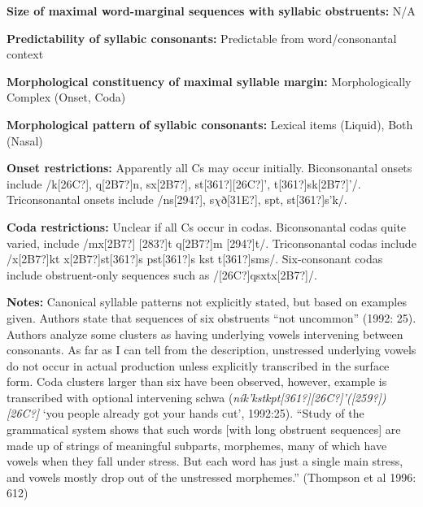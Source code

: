 \begin{styleBody}
\textbf{Size of maximal word{}-marginal sequences with syllabic obstruents:} N/A
\end{styleBody}

\begin{styleBody}
\textbf{Predictability of syllabic consonants:} Predictable from word/consonantal context
\end{styleBody}

\begin{styleBody}
\textbf{Morphological constituency of maximal syllable margin:} Morphologically Complex (Onset, Coda)
\end{styleBody}

\begin{styleBody}
\textbf{Morphological pattern of syllabic consonants:} Lexical items (Liquid), Both (Nasal)
\end{styleBody}

\begin{styleBody}
\textbf{Onset restrictions:} Apparently all Cs may occur initially. Biconsonantal onsets include /k[26C?], q[2B7?]n, sx[2B7?], st[361?][26C?]’, t[361?]sk[2B7?]’/. Triconsonantal onsets include /ns[294?], s$\chi $ð[31E?], spt, st[361?]s’k/.
\end{styleBody}

\begin{styleBody}
\textbf{Coda restrictions:} Unclear if all Cs occur in codas. Biconsonantal codas quite varied, include /mx[2B7?] [283?]t q[2B7?]m [294?]t/. Triconsonantal codas include /x[2B7?]kt x[2B7?]st[361?]s pst[361?]s kst t[361?]sms/. Six-consonant codas include obstruent-only sequences such as /[26C?]qsxtx[2B7?]/.
\end{styleBody}

\begin{styleBody}
\textbf{Notes:} Canonical syllable patterns not explicitly stated, but based on examples given. Authors state that sequences of six obstruents “not uncommon” (1992: 25). Authors analyze some clusters as having underlying vowels intervening between consonants. As far as I can tell from the description, unstressed underlying vowels do not occur in actual production unless explicitly transcribed in the surface form. Coda clusters larger than six have been observed, however, example is transcribed with optional intervening schwa (\textit{n\'{i}k’kstkpt[361?][26C?]’([259?])[26C?]} ‘you people already got your hands cut’, 1992:25). “Study of the grammatical system shows that such words [with long obstruent sequences] are made up of strings of meaningful subparts, morphemes, many of which have vowels when they fall under stress. But each word has just a single main stress, and vowels mostly drop out of the unstressed morphemes.” (Thompson et al 1996: 612)
\end{styleBody}

